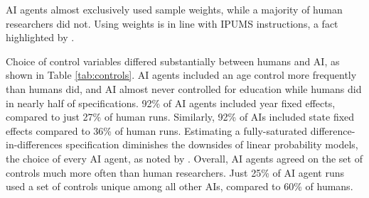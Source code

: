 \documentclass[
  12pt]{article}
\begin{document}
AI agents almost exclusively used sample weights, while a majority of
human researchers did not. Using weights is in line with IPUMS
instructions, a fact highlighted by \citet{huntingtonklein2025sources}.

Choice of control variables differed substantially between humans and
AI, as shown in Table \ref{tab:controls}. AI agents included an age
control more frequently than humans did, and AI almost never controlled
for education while humans did in nearly half of specifications. 92\% of
AI agents included year fixed effects, compared to just 27\% of human
runs. Similarly, 92\% of AIs included state fixed effects compared to
36\% of human runs. Estimating a fully-saturated
difference-in-differences specification diminishes the downsides of
linear probability models, the choice of every AI agent, as noted by
\citet{huntingtonklein2025sources}. Overall, AI agents agreed on the set
of controls much more often than human researchers. Just 25\% of AI
agent runs used a set of controls unique among all other AIs, compared
to 60\% of humans.
\end{document}
